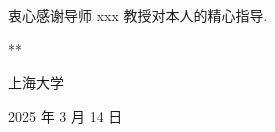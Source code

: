 \begin{acknowledgement}
  衷心感谢导师 xxx 教授对本人的精心指导. 

  \vspace{50bp}

  \hfill ***

  \hfill 上海大学

  \hfill 2025 年 3 月 14 日

\end{acknowledgement}
